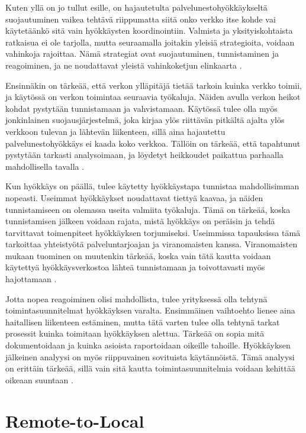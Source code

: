 Kuten yllä on jo tullut esille, on hajautetulta palvelunestohyökkäykseltä
suojautuminen vaikea tehtävä riippumatta siitä onko verkko itse kohde vai
käytetäänkö sitä vain hyökkäysten koordinointiin. Valmista ja yksityiskohtaista
ratkaisua ei ole tarjolla, mutta seuraamalla joitakin yleisiä strategioita,
voidaan vahinkoja rajoittaa. Nämä strategiat ovat suojautuminen, tunnistaminen
ja reagoiminen, ja ne noudattavat yleistä vahinkoketjun elinkaarta \cite{DDOS}.

Ensinnäkin on tärkeää, että verkon ylläpitäjä tietää tarkoin kuinka verkko
toimii, ja käytössä on verkon toimintaa seuraavia työkaluja. Näiden avulla
verkon heikot kohdat pystytään tunnistamaan ja vahvistamaan. Käytössä tulee
olla myös jonkinlainen suojausjärjestelmä, joka kirjaa ylös riittävän pitkältä
ajalta ylös verkkoon tulevan ja lähtevän liikenteen, sillä aina hajautettu
palvelunestohyökkäys ei kaada koko verkkoa. Tällöin on tärkeää, että tapahtunut
pystytään tarkasti analysoimaan, ja löydetyt heikkoudet paikattua parhaalla
mahdollisella tavalla \cite{DDOS}.

Kun hyökkäys on päällä, tulee käytetty hyökkäystapa tunnistaa mahdollisimman
nopeasti. Useimmat hyökkäykset noudattavat tiettyä kaavaa, ja näiden
tunnistamiseen on olemassa useita valmiita työkaluja. Tämä on tärkeää, koska
tunnistamisen jälkeen voidaan rajata, mistä hyökkäys on peräisin ja tehdä
tarvittavat toimenpiteet hyökkäyksen torjumiseksi. Useimmissa tapauksissa
tämä tarkoittaa yhteistyötä palveluntarjoajan ja viranomaisten kanssa.
Viranomaisten mukaan tuominen on muutenkin tärkeää, koska vain tätä kautta
voidaan käytettyä hyökkäysverkostoa lähteä tunnistamaan ja toivottavasti myös
hajottamaan \cite{DDOS}.

Jotta nopea reagoiminen olisi mahdollista, tulee yrityksessä olla tehtynä
toimintasuunnitelmat hyökkäyksen varalta. Ensimmäinen vaihtoehto lienee aina
haitallisen liikenteen estäminen, mutta tätä varten tulee olla tehtynä tarkat
prosessit kuinka toimitaan hyökkäyksen alettua. Tärkeää on sopia mitä
dokumentoidaan ja kuinka asioista raportoidaan oikeille tahoille. Hyökkäyksen
jälkeinen analyysi on myös riippuvainen sovituista käytännöistä. Tämä analyysi
on erittäin tärkeää, sillä vain sitä kautta toimintasuunnitelmia voidaan
kehittää oikeaan suuntaan \cite{DDOS}.


\section{Remote-to-Local}

